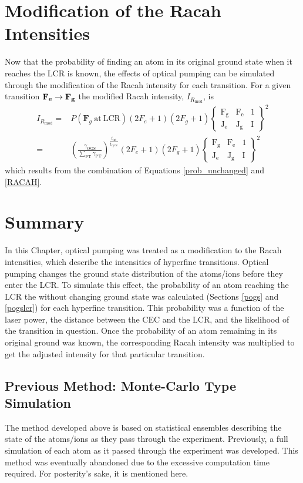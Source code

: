 \section{Modification of the Racah Intensities}
Now that the probability of finding an atom in its original ground state when it reaches the LCR is known, the effects of optical pumping can be simulated through the modification of the Racah intensity for each transition. For a given transition $\bf{F}_e \rightarrow \bf{F}_g$ the modified Racah intensity, $I_{R_{\mathrm{mod}}}$, is 
\begin{align}
I_{R_{\mathrm{mod}}} =& P(\mathbf{F}_g\ \mathrm{at\ LCR})
(2F_e+1)(2F_g+1)
\left\lbrace
\mathrm{
\begin{matrix}
F_g & F_e & 1\\
J_e & J_g & \mathrm{I} 
\end{matrix}
}
\right\rbrace^2\\
=& \left(\frac{\gamma_{\mathrm{OGS}}}{\sum_{\mathrm{PT}}\gamma_{\mathrm{PT}}}\right)^{\frac{t_{\mathrm{int}}}{t_{\mathrm{cycle}}}}
(2F_e+1)(2F_g+1)
\left\lbrace
\mathrm{
\begin{matrix}
F_g & F_e & 1\\
J_e & J_g & \mathrm{I} 
\end{matrix}
}
\right\rbrace^2
\label{final_eq}
\end{align}
which results from the combination of Equations \ref{prob_unchanged} and \ref{RACAH}.

\section{Summary}
In this Chapter, optical pumping was treated as a modification to the Racah intensities, which describe the intensities of hyperfine transitions. Optical pumping changes the ground state distribution of the atoms/ions before they enter the LCR. To simulate this effect, the probability of an atom reaching the LCR the without changing ground state was calculated (Sections \ref{pogs} and \ref{pogslcr}) for each hyperfine transition. This probability was a function of the laser power, the distance between the CEC and the LCR, and the likelihood of the transition in question. Once the probability of an atom remaining in its original ground was known, the corresponding Racah intensity was multiplied to get the adjusted intensity for that particular transition. 

\subsection{Previous Method: Monte-Carlo Type Simulation}
The method developed above is based on statistical ensembles describing the state of the atoms/ions as they pass through the experiment. Previously, a full simulation of each atom as it passed through the experiment was developed. This method was eventually abandoned due to the excessive computation time required. For posterity's sake, it is mentioned here.


